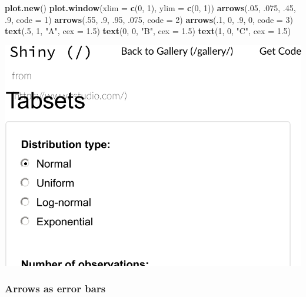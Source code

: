 \documentclass[]{book}
\newenvironment{Shaded}{\begin{snugshade}}{\end{snugshade}}
\newcommand{\DataTypeTok}[1]{\textcolor[rgb]{0.13,0.29,0.53}{#1}}
\newcommand{\DecValTok}[1]{\textcolor[rgb]{0.00,0.00,0.81}{#1}}
\newcommand{\FloatTok}[1]{\textcolor[rgb]{0.00,0.00,0.81}{#1}}
\newcommand{\KeywordTok}[1]{\textcolor[rgb]{0.13,0.29,0.53}{\textbf{#1}}}
\newcommand{\NormalTok}[1]{#1}
\newcommand{\StringTok}[1]{\textcolor[rgb]{0.31,0.60,0.02}{#1}}
\theoremstyle{definition}
\theoremstyle{definition}
\theoremstyle{definition}
\theoremstyle{remark}
\begin{document}
\begin{Shaded}
\begin{Highlighting}[]
\KeywordTok{plot.new}\NormalTok{()}
\KeywordTok{plot.window}\NormalTok{(}\DataTypeTok{xlim =} \KeywordTok{c}\NormalTok{(}\DecValTok{0}\NormalTok{, }\DecValTok{1}\NormalTok{), }\DataTypeTok{ylim =} \KeywordTok{c}\NormalTok{(}\DecValTok{0}\NormalTok{, }\DecValTok{1}\NormalTok{))}
\KeywordTok{arrows}\NormalTok{(.}\DecValTok{05}\NormalTok{, }\FloatTok{.075}\NormalTok{, }\FloatTok{.45}\NormalTok{, }\FloatTok{.9}\NormalTok{, }\DataTypeTok{code =} \DecValTok{1}\NormalTok{)}
\KeywordTok{arrows}\NormalTok{(.}\DecValTok{55}\NormalTok{, }\FloatTok{.9}\NormalTok{, }\FloatTok{.95}\NormalTok{, }\FloatTok{.075}\NormalTok{, }\DataTypeTok{code =} \DecValTok{2}\NormalTok{)}
\KeywordTok{arrows}\NormalTok{(.}\DecValTok{1}\NormalTok{, }\DecValTok{0}\NormalTok{, }\FloatTok{.9}\NormalTok{, }\DecValTok{0}\NormalTok{, }\DataTypeTok{code =} \DecValTok{3}\NormalTok{)}
\KeywordTok{text}\NormalTok{(.}\DecValTok{5}\NormalTok{, }\DecValTok{1}\NormalTok{, }\StringTok{"A"}\NormalTok{, }\DataTypeTok{cex =} \FloatTok{1.5}\NormalTok{)}
\KeywordTok{text}\NormalTok{(}\DecValTok{0}\NormalTok{, }\DecValTok{0}\NormalTok{, }\StringTok{"B"}\NormalTok{, }\DataTypeTok{cex =} \FloatTok{1.5}\NormalTok{)}
\KeywordTok{text}\NormalTok{(}\DecValTok{1}\NormalTok{, }\DecValTok{0}\NormalTok{, }\StringTok{"C"}\NormalTok{, }\DataTypeTok{cex =} \FloatTok{1.5}\NormalTok{)}
\end{Highlighting}
\end{Shaded}

\includegraphics[width=0.5\linewidth]{Rcourse_files/figure-latex/unnamed-chunk-267-1}

\hypertarget{arrows-as-error-bars}{%
\subsubsection{Arrows as error bars}\label{arrows-as-error-bars}}
\end{document}
